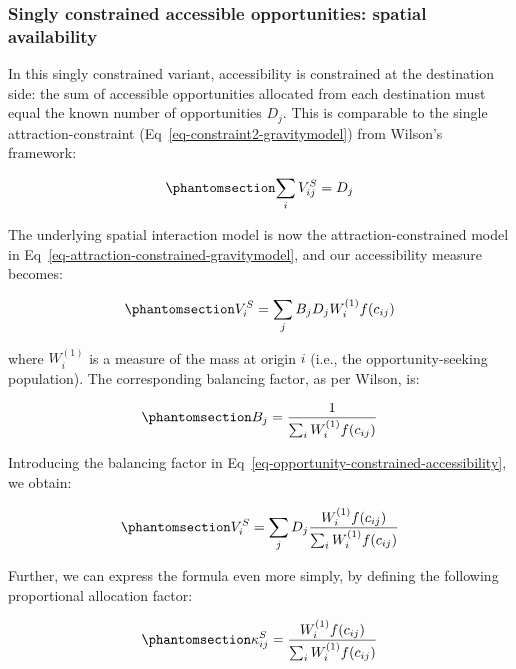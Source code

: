 \documentclass[
  10pt,
  letterpaper,
]{article}
\begin{document}
\subsubsection{Singly constrained accessible opportunities: spatial
availability}\label{singly-constrained-accessible-opportunities-spatial-availability}

In this singly constrained variant, accessibility is constrained at the
destination side: the sum of accessible opportunities allocated from
each destination must equal the known number of opportunities \(D_j\).
This is comparable to the single attraction-constraint
(Eq~\ref{eq-constraint2-gravitymodel}) from Wilson's framework:

\begin{equation}\phantomsection\label{eq-opportunity-constraint}{
\sum_i V^S_{ij} =  D_j
}\end{equation}

The underlying spatial interaction model is now the
attraction-constrained model in
Eq~\ref{eq-attraction-constrained-gravitymodel}, and our accessibility
measure becomes:

\begin{equation}\phantomsection\label{eq-opportunity-constrained-accessibility}{
V^S_{i} = \sum_j B_j D_j W_i^{(1)} f(c_{ij})
}\end{equation}

\noindent where \(W_i^{(1)}\) is a measure of the mass at origin \(i\)
(i.e., the opportunity-seeking population). The corresponding balancing
factor, as per Wilson, is:

\begin{equation}\phantomsection\label{eq-opportunity-constrained-proportionality-constants}{
B_j = \frac{1}{\sum_i W_i^{(1)} f(c_{ij})}
}\end{equation}

Introducing the balancing factor in
Eq~\ref{eq-opportunity-constrained-accessibility}, we obtain:

\begin{equation}\phantomsection\label{eq-opportunity-constrained-accessibility-with-balancing-factor}{
V^S_{i} = \sum_j D_j \frac{W_i^{(1)} f(c_{ij})}{\sum_i W_i^{(1)} f(c_{ij})}
}\end{equation}

Further, we can express the formula even more simply, by defining the
following proportional allocation factor:

\begin{equation}\phantomsection\label{eq-opportunity-constrained-proportional-allocation-factor}{
\kappa^S_{ij} = \frac{W_i^{(1)} f(c_{ij})}{\sum_i W_i^{(1)} f(c_{ij})}
}\end{equation}
\end{document}
